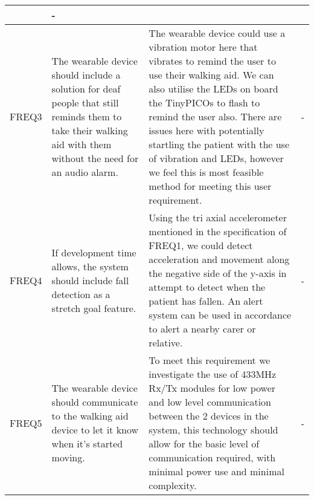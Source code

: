 \begin{xltabular}[H]{\textwidth}{c | X | X | X}
        &

        -\\

        \midrule

        FREQ3

        &

        The wearable device should include a solution for deaf people that still reminds them to take their walking aid with them without the need for an audio alarm.

        &

        The wearable device could use a vibration motor here that vibrates to remind the user to use their walking aid. We can also utilise the LEDs on board the TinyPICOs to flash to remind the user also. There are issues here with potentially startling the patient with the use of vibration and LEDs, however we feel this is most feasible method for meeting this user requirement.

        &

        -\\

        \midrule

        FREQ4

        &

        If development time allows, the system should include fall detection as a stretch goal feature.

        &

        Using the tri axial accelerometer mentioned in the specification of FREQ1, we could detect acceleration and movement along the negative side of the y-axis in attempt to detect when the patient has fallen. An alert system can be used in accordance to alert a nearby carer or relative.

        &

        -\\

        \midrule

        FREQ5

        &

        The wearable device should communicate to the walking aid device to let it know when it's started moving.

        &

        To meet this requirement we investigate the use of 433MHz Rx/Tx modules for low power and low level communication between the 2 devices in the system, this technology should allow for the basic level of communication required, with minimal power use and minimal complexity.

        &

        -\\

	\end{xltabular}
	\label{tbl:func_reqs_table}
